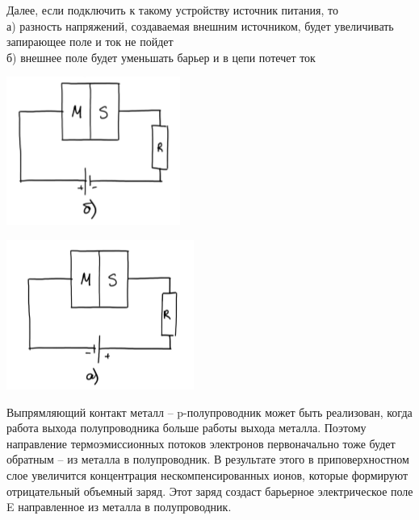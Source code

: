 \documentclass[a4paper,12pt]{article}
\begin{document}
Далее, если подключить к такому устройству источник питания, то  \\
а) разность напряжений, создаваемая внешним источником, будет увеличивать запирающее поле и ток не пойдет \\
б) внешнее поле будет уменьшать барьер и в цепи потечет ток

\begin{minipage}{.49\textwidth}
  \begin{center}
 	\includegraphics[width=0.6\linewidth]{fig9}
  \end{center}
\end{minipage}
\begin{minipage}{.49\textwidth}
	\begin{center}
 		 \includegraphics[width=0.6\linewidth]{fig10}
  	\end{center}
\end{minipage}

Выпрямляющий контакт металл -- p-полупроводник может быть реализован, когда работа выхода полупроводника больше работы выхода металла. Поэтому направление термоэмиссионных потоков электронов первоначально тоже будет обратным – из металла в полупроводник. В результате этого в приповерхностном слое увеличится концентрация нескомпенсированных ионов, которые формируют отрицательный объемный заряд. Этот заряд создаст барьерное электрическое поле E направленное из металла в  полупроводник.
\end{document}
